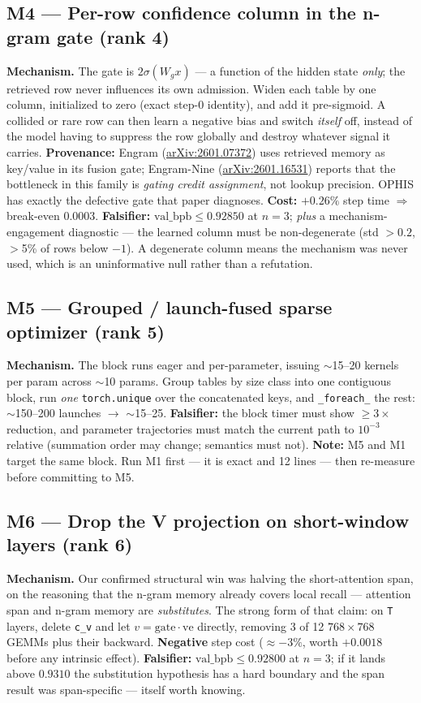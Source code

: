 \documentclass{article}
\newcommand{\vb}{\mathrm{val\_bpb}}
\begin{document}
\subsection{M4 --- Per-row confidence column in the n-gram gate (rank 4)}
\textbf{Mechanism.} The gate is $2\sigma(W_g x)$ --- a function of the hidden state \emph{only}; the retrieved row never influences its own admission. Widen each table by one column, initialized to zero (exact step-0 identity), and add it pre-sigmoid. A collided or rare row can then learn a negative bias and switch \emph{itself} off, instead of the model having to suppress the row globally and destroy whatever signal it carries.
\textbf{Provenance:} Engram (\href{https://arxiv.org/abs/2601.07372}{arXiv:2601.07372}) uses retrieved memory as key/value in its fusion gate; Engram-Nine (\href{https://arxiv.org/pdf/2601.16531}{arXiv:2601.16531}) reports that the bottleneck in this family is \emph{gating credit assignment}, not lookup precision. OPHIS has exactly the defective gate that paper diagnoses.
\textbf{Cost:} $+0.26\%$ step time $\Rightarrow$ break-even $0.0003$. \textbf{Falsifier:} $\vb\le0.92850$ at $n{=}3$; \emph{plus} a mechanism-engagement diagnostic --- the learned column must be non-degenerate (std $>$$0.2$, $>$5\% of rows below $-1$). A degenerate column means the mechanism was never used, which is an uninformative null rather than a refutation.

\subsection{M5 --- Grouped / launch-fused sparse optimizer (rank 5)}
\textbf{Mechanism.} The block runs eager and per-parameter, issuing $\sim$15--20 kernels per param across $\sim$10 params. Group tables by size class into one contiguous block, run \emph{one} \texttt{torch.unique} over the concatenated keys, and \texttt{\_foreach\_} the rest: $\sim$150--200 launches $\to$ $\sim$15--25.
\textbf{Falsifier:} the block timer must show $\ge$$3\times$ reduction, and parameter trajectories must match the current path to $10^{-3}$ relative (summation order may change; semantics must not). \textbf{Note:} M5 and M1 target the same block. Run M1 first --- it is exact and 12 lines --- then re-measure before committing to M5.

\subsection{M6 --- Drop the V projection on short-window layers (rank 6)}
\textbf{Mechanism.} Our confirmed structural win was halving the short-attention span, on the reasoning that the n-gram memory already covers local recall --- attention span and n-gram memory are \emph{substitutes}. The strong form of that claim: on \texttt{T} layers, delete \texttt{c\_v} and let $v = \mathrm{gate}\cdot\mathrm{ve}$ directly, removing 3 of 12 $768{\times}768$ GEMMs plus their backward. \textbf{Negative} step cost ($\approx$$-3\%$, worth $+0.0018$ before any intrinsic effect).
\textbf{Falsifier:} $\vb\le0.92800$ at $n{=}3$; if it lands above $0.9310$ the substitution hypothesis has a hard boundary and the span result was span-specific --- itself worth knowing.
\end{document}
